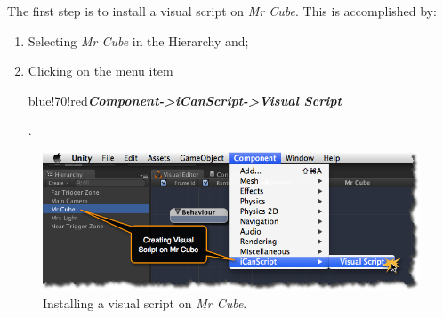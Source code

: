 The first step is to install a visual script on \emph{Mr Cube}. This is accomplished by:

\begin{enumerate}
\item Selecting \emph{Mr Cube} in the Hierarchy and;

\item Clicking on the menu item \begin{color}{blue!70!red}\emph{\textbf{Component->iCanScript->Visual Script}}\end{color}.

\end{enumerate}

\begin{figure}[htbp]
\centering
\includegraphics[keepaspectratio,width=\textwidth,height=0.75\textheight]{ics-installing-visual-script-on-mr-cube.png}
\caption{Installing a visual script on \emph{Mr Cube}.}
\label{ics-installing-visual-script-on-mr-cube.png}
\end{figure}

